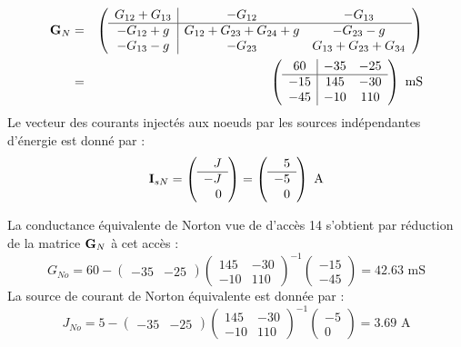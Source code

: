 \begin{eqnarray*}
	{\bf G}_N & = &\left(
	\begin{array}{c|cc}
		G_{12}+G_{13} & -G_{12} & -G_{13}\\ \hline
		-G_{12}+g & G_{12}+G_{23}+G_{24}+g & -G_{23}-g\\
		-G_{13}-g & -G_{23} & G_{13}+G_{23}+G_{34}
	\end{array} \right) \\ & = & 
	\left(\begin{array}{c|cc}
		60 & -35 & -25 \\\hline
		-15 & 145 & -30\\
		-45 & -10 & 110
	\end{array}\right)\,\, \mbox{mS}
\end{eqnarray*} 
Le vecteur des courants injectés aux noeuds par les sources
indépendantes d'énergie est donné par :
\[{\bf I}_{sN}=\left(
\begin{array}{r}
J\\ \hline
-J\\
0
\end{array}\right)= 
\left(\begin{array}{r}
5\\ \hline
-5\\
0
\end{array}\right)\,\, \text{A}
\]


La conductance équivalente de Norton vue de d'accès 14 s'obtient par
réduction de la matrice ${\bf G}_N$ à cet accès :
\[G_{No}=60-
\begin{pmatrix}
-35 & -25
\end{pmatrix}
\begin{pmatrix}
145 & -30\\
-10 & 110
\end{pmatrix}^{-1}
\begin{pmatrix}
-15\\
-45
\end{pmatrix}= 42.63 \mbox{~mS}\]
La source de courant de Norton équivalente est donnée par :
\[J_{No}=5-
\begin{pmatrix}
-35 & -25
\end{pmatrix}
\begin{pmatrix}
145 & -30\\
-10 & 110
\end{pmatrix}^{-1}
\begin{pmatrix}
-5\\0
\end{pmatrix}=3.69 \text{~A}\]

